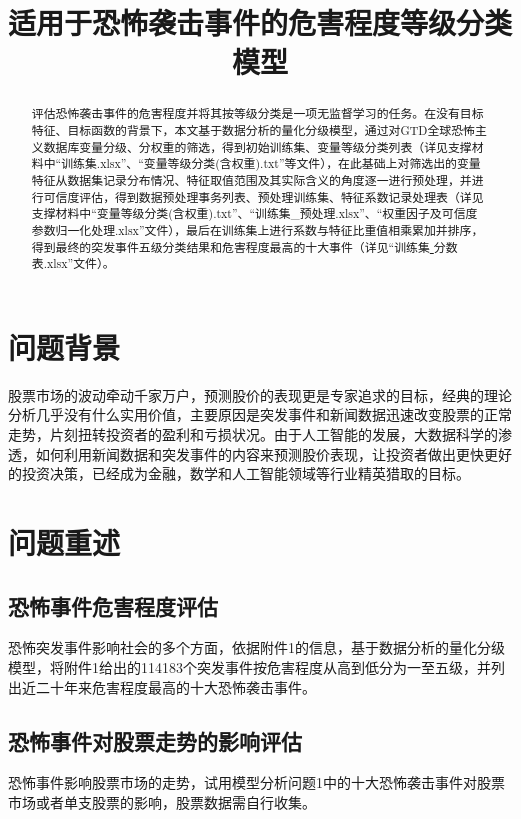 \documentclass{cumcmthesis}
\title{适用于恐怖袭击事件的危害程度等级分类模型}
\begin{document}
\maketitle
\begin{abstract}
评估恐怖袭击事件的危害程度并将其按等级分类是一项无监督学习的任务。在没有目标特征、目标函数的背景下，本文基于数据分析的量化分级模型，通过对GTD全球恐怖主义数据库变量分级、分权重的筛选，得到初始训练集、变量等级分类列表（详见支撑材料中“训练集.xlsx”、“变量等级分类(含权重).txt”等文件），在此基础上对筛选出的变量特征从数据集记录分布情况、特征取值范围及其实际含义的角度逐一进行预处理，并进行可信度评估，得到数据预处理事务列表、预处理训练集、特征系数记录处理表（详见支撑材料中“变量等级分类(含权重).txt”、“训练集\_预处理.xlsx”、“权重因子及可信度参数归一化处理.xlsx”文件），最后在训练集上进行系数与特征比重值相乘累加并排序，得到最终的突发事件五级分类结果和危害程度最高的十大事件（详见“训练集\uline{ }分数表.xlsx”文件）。

\end{abstract}

\tableofcontents 
\newpage
\section{问题背景}
 股票市场的波动牵动千家万户，预测股价的表现更是专家追求的目标，经典的理论分析几乎没有什么实用价值，主要原因是突发事件和新闻数据迅速改变股票的正常走势，片刻扭转投资者的盈利和亏损状况。由于人工智能的发展，大数据科学的渗透，如何利用新闻数据和突发事件的内容来预测股价表现，让投资者做出更快更好的投资决策，已经成为金融，数学和人工智能领域等行业精英猎取的目标。


\section{问题重述}

\subsection{恐怖事件危害程度评估}
 恐怖突发事件影响社会的多个方面，依据附件1的信息，基于数据分析的量化分级模型，将附件1给出的114183个突发事件按危害程度从高到低分为一至五级，并列出近二十年来危害程度最高的十大恐怖袭击事件。 
\subsection{恐怖事件对股票走势的影响评估}
 恐怖事件影响股票市场的走势，试用模型分析问题1中的十大恐怖袭击事件对股票市场或者单支股票的影响，股票数据需自行收集。 
 
\end{document}
